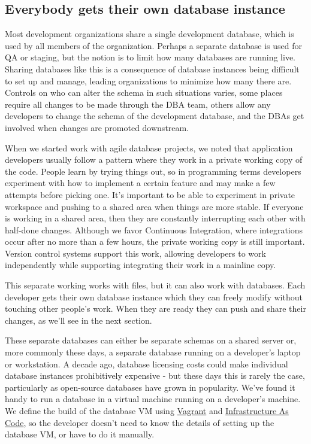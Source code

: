 \documentclass[12pt]{article}
\begin{document}
\subsection{Everybody gets their own database instance}

Most development organizations share a single development database,
which is used by all members of the organization. Perhaps a separate
database is used for QA or staging, but the notion is to limit how many
databases are running live. Sharing databases like this is a consequence
of database instances being difficult to set up and manage, leading
organizations to minimize how many there are. Controls on who can alter
the schema in such situations varies, some places require all changes to
be made through the DBA team, others allow any developers to change the
schema of the development database, and the DBAs get involved when
changes are promoted downstream.

When we started work with agile database projects, we noted that
application developers usually follow a pattern where they work in a
private working copy of the code. People learn by trying things out, so
in programming terms developers experiment with how to implement a
certain feature and may make a few attempts before picking one. It's
important to be able to experiment in private workspace and pushing to a
shared area when things are more stable. If everyone is working in a
shared area, then they are constantly interrupting each other with
half-done changes. Although we favor Continuous Integration, where
integrations occur after no more than a few hours, the private working
copy is still important. Version control systems support this work,
allowing developers to work independently while supporting integrating
their work in a mainline copy.

This separate working works with files, but it can also work with
databases. Each developer gets their own database instance which they
can freely modify without touching other people's work. When they are
ready they can push and share their changes, as we'll see in the next
section.

These separate databases can either be separate schemas on a shared
server or, more commonly these days, a separate database running on a
developer's laptop or workstation. A decade ago, database licensing
costs could make individual database instances prohibitively expensive -
but these days this is rarely the case, particularly as open-source
databases have grown in popularity. We've found it handy to run a
database in a virtual machine running on a developer's machine. We
define the build of the database VM using
\href{https://www.vagrantup.com}{Vagrant} and
\href{https://martinfowler.com/bliki/InfrastructureAsCode.html}{Infrastructure
As Code}, so the developer doesn't need to know the details of setting
up the database VM, or have to do it manually.
\end{document}
